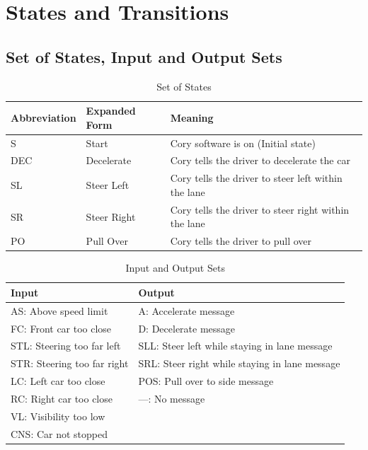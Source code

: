 \documentclass[10pt,letterpaper]{article}
\begin{document}
\section{States and Transitions}
\subsection{Set of States, Input and Output Sets}
\begin{table}[h]
\centering
\begin{tabular}{@{}lll@{}}
\toprule
Abbreviation & Expanded Form & Meaning                                              \\ \midrule
S            & Start         & Cory software is on (Initial state)                  \\
DEC          & Decelerate    & Cory tells the driver to decelerate the car          \\
SL           & Steer Left    & Cory tells the driver to steer left within the lane  \\
SR           & Steer Right   & Cory tells the driver to steer right within the lane \\
PO           & Pull Over     & Cory tells the driver to pull over                   \\ \bottomrule
\end{tabular}
\caption{Set of States}
\label{tab:my-table}
\end{table}

\begin{table}[h]
\centering
\begin{tabular}{@{}ll@{}}
\toprule
Input                       & Output                                         \\ \midrule
AS: Above speed limit       & A: Accelerate message                          \\
FC: Front car too close     & D: Decelerate message                          \\
STL: Steering too far left  & SLL: Steer left while staying in lane message  \\
STR: Steering too far right & SRL: Steer right while staying in lane message \\
LC: Left car too close      & POS: Pull over to side message                 \\
RC: Right car too close     & —: No message                                  \\
VL: Visibility too low      &                                                \\
CNS: Car not stopped        &                                                \\ \bottomrule
\end{tabular}
\caption{Input and Output Sets}
\label{tab:my-table}
\end{table}
\end{document}
